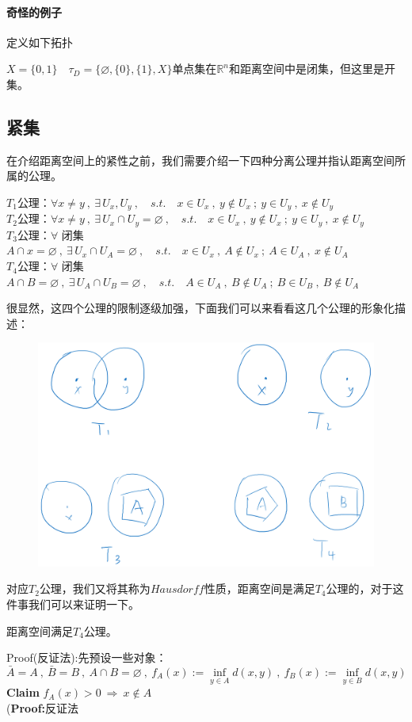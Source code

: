 \paragraph*{奇怪的例子} 定义如下拓扑

$X=\{0,1\} \quad \tau_D=\{\varnothing,\{0\},\{1\},X\}$单点集在$\mathbb{R}^n$和距离空间中是闭集，但这里是开集。

\subsection{紧集}
在介绍距离空间上的紧性之前，我们需要介绍一下四种分离公理并指认距离空间所属的公理。
\begin{proposition}[分离公理]
    $T_1$公理：$\forall x \neq y \ , \ \exists \, U_x,U_y \ , \quad s.t. \quad x \in U_x \ , \ y \notin U_x \ ; \ y \in U_y \ , \ x \notin U_y$\\
    $T_2$公理：$\forall x \neq y \ , \ \exists \, U_x \cap U_y=\varnothing \ , \quad s.t. \quad x \in U_x \ , \ y \notin U_x \ ; \ y \in U_y \ , \ x \notin U_y$\\
    $T_3$公理：$\forall$ 闭集$A \cap x=\varnothing \ , \ \exists \, U_x \cap U_A=\varnothing \ , \quad s.t. \quad x \in U_x \ , \ A \notin U_x \ ; \ A \in U_A \ , \ x \notin U_A$\\
    $T_4$公理：$\forall$ 闭集$A \cap B=\varnothing \ , \ \exists \, U_A \cap U_B=\varnothing \ , \quad s.t. \quad A \in U_A \ , \ B \notin U_A \ ; \ B \in U_B \ , \ B \notin U_A$
\end{proposition}
很显然，这四个公理的限制逐级加强，下面我们可以来看看这几个公理的形象化描述：
\begin{figure}[htbp]
    \center
    \includegraphics[scale=0.4]{./fig/2.2.2.png}
\end{figure}
对应$T_2$公理，我们又将其称为$Hausdorff$性质，距离空间是满足$T_4$公理的，对于这件事我们可以来证明一下。
\begin{theorem}
    距离空间满足$T_4$公理。
\end{theorem}
Proof(反证法):先预设一些对象：
\[\bar{A}=A \ , \ \bar{B}=B \ , \ A \cap B=\varnothing \ , \ f_A(x):=\mathop {\text{inf}}\limits_{y \in A}d(x,y) \ , \ f_B(x):=\mathop {\text{inf}}\limits_{y \in B}d(x,y)\]
\textbf{Claim} \quad $f_A(x)>0 \ \Rightarrow \ x \notin A$\\
(\textbf{Proof:}反证法

